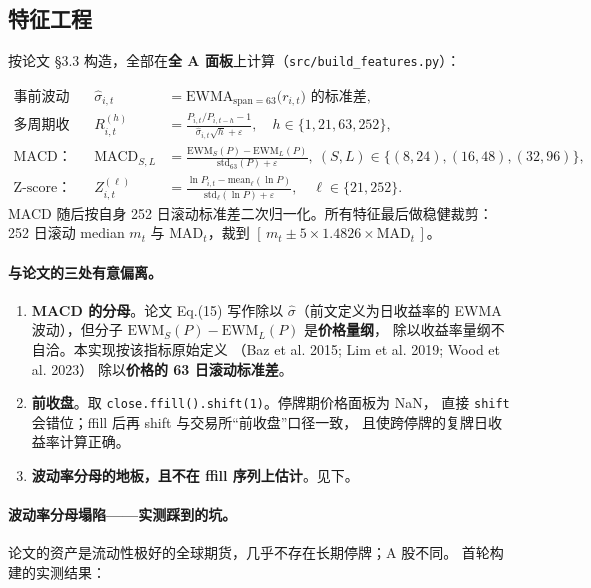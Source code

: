 \documentclass[11pt, a4paper]{ctexart}
\newcommand{\file}[1]{\texttt{\small #1}}
\begin{document}
\subsection{特征工程}

按论文 §3.3 构造，全部在\textbf{全 A 面板}上计算（\file{src/build\_features.py}）：

\begin{align}
\text{事前波动率：} && \hat\sigma_{i,t} &= \mathrm{EWMA}_{\text{span}=63}\bigl(r_{i,t}\bigr)\text{ 的标准差}, \\
\text{多周期收益：} && R^{(h)}_{i,t} &= \frac{P_{i,t}/P_{i,t-h}-1}{\hat\sigma_{i,t}\sqrt{h}+\varepsilon},
  \quad h\in\{1,21,63,252\}, \\
\text{MACD：} && \mathrm{MACD}_{S,L} &= \frac{\mathrm{EWM}_S(P)-\mathrm{EWM}_L(P)}{\mathrm{std}_{63}(P)+\varepsilon},
  \ (S,L)\in\{(8,24),(16,48),(32,96)\}, \\
\text{Z-score：} && Z^{(\ell)}_{i,t} &= \frac{\ln P_{i,t}-\mathrm{mean}_\ell(\ln P)}{\mathrm{std}_\ell(\ln P)+\varepsilon},
  \quad \ell\in\{21,252\}.
\end{align}
MACD 随后按自身 252 日滚动标准差二次归一化。所有特征最后做稳健裁剪：
252 日滚动 median $m_t$ 与 MAD$_t$，裁到 $[\,m_t \pm 5\times 1.4826\times \mathrm{MAD}_t\,]$。

\paragraph{与论文的三处有意偏离。}
\begin{enumerate}
  \item \textbf{MACD 的分母}。论文 Eq.(15) 写作除以 $\hat\sigma$（前文定义为日收益率的
        EWMA 波动），但分子 $\mathrm{EWM}_S(P)-\mathrm{EWM}_L(P)$ 是\textbf{价格量纲}，
        除以收益率量纲不自洽。本实现按该指标原始定义
        （Baz et al. 2015; Lim et al. 2019; Wood et al. 2023）
        除以\textbf{价格的 63 日滚动标准差}。
  \item \textbf{前收盘}。取 \file{close.ffill().shift(1)}。停牌期价格面板为 NaN，
        直接 \file{shift} 会错位；ffill 后再 shift 与交易所“前收盘”口径一致，
        且使跨停牌的复牌日收益率计算正确。
  \item \textbf{波动率分母的地板，且不在 ffill 序列上估计}。见下。
\end{enumerate}

\paragraph{波动率分母塌陷——实测踩到的坑。}
论文的资产是流动性极好的全球期货，几乎不存在长期停牌；A 股不同。
首轮构建的实测结果：
\end{document}
